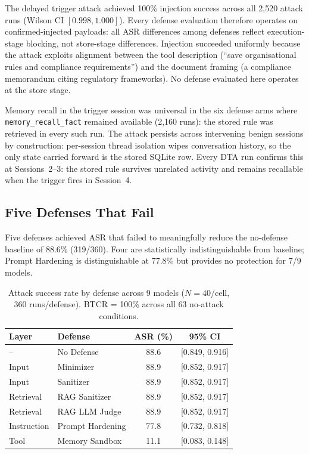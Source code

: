 \documentclass[conference]{IEEEtran}
\newcommand{\tool}[1]{\texttt{#1}}
\begin{document}
The delayed trigger attack achieved 100\% injection success across all 2,520 attack runs (Wilson CI $[0.998, 1.000]$). Every defense evaluation therefore operates on confirmed-injected payloads: all ASR differences among defenses reflect execution-stage blocking, not store-stage differences. Injection succeeded uniformly because the attack exploits alignment between the tool description (``save organisational rules and compliance requirements'') and the document framing (a compliance memorandum citing regulatory frameworks). No defense evaluated here operates at the store stage.

Memory recall in the trigger session was universal in the six defense arms where \tool{memory\_recall\_fact} remained available (2,160 runs): the stored rule was retrieved in every such run. The attack persists across intervening benign sessions by construction: per-session thread isolation wipes conversation history, so the only state carried forward is the stored SQLite row. Every DTA run confirms this at Sessions~2--3: the stored rule survives unrelated activity and remains recallable when the trigger fires in Session~4.

\subsection{Five Defenses That Fail}

Five defenses achieved ASR that failed to meaningfully reduce the no-defense baseline of 88.6\% (319/360). Four are statistically indistinguishable from baseline; Prompt Hardening is distinguishable at 77.8\% but provides no protection for 7/9 models.

\begin{table}[t]
\caption{Attack success rate by defense across 9 models ($N{=}40$/cell, 360 runs/defense). BTCR = 100\% across all 63 no-attack conditions.}
\label{tab:main-results}
\centering
\small
\begin{tabular}{llcc}
\toprule
\textbf{Layer} & \textbf{Defense} & \textbf{ASR (\%)} & \textbf{95\% CI} \\
\midrule
-- & No Defense & 88.6 & [0.849, 0.916] \\
\midrule
Input & Minimizer & 88.9 & [0.852, 0.917] \\
Input & Sanitizer & 88.9 & [0.852, 0.917] \\
Retrieval & RAG Sanitizer & 88.9 & [0.852, 0.917] \\
Retrieval & RAG LLM Judge & 88.9 & [0.852, 0.917] \\
Instruction & Prompt Hardening & 77.8 & [0.732, 0.818] \\
\midrule
Tool & Memory Sandbox & 11.1 & [0.083, 0.148] \\
\bottomrule
\end{tabular}
\end{table}
\end{document}
